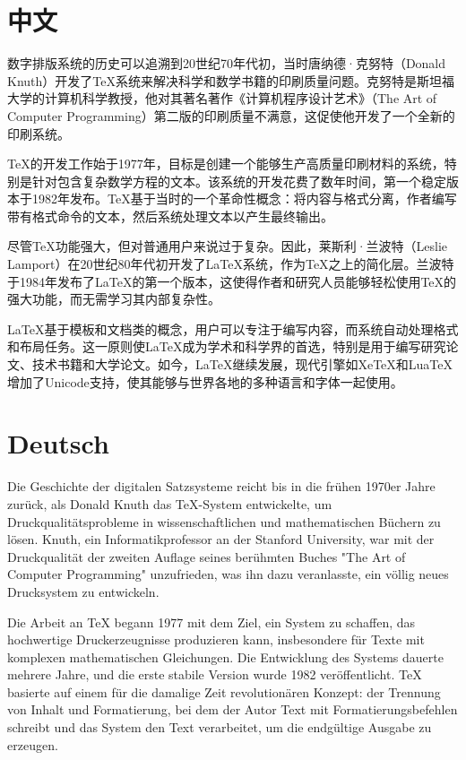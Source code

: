 \documentclass[a4paper,12pt]{article}
\newcommand{\textchinese}[1]{#1}
\begin{document}
\section{中文}
  \textchinese{数字排版系统的历史可以追溯到20世纪70年代初，当时唐纳德·克努特（Donald Knuth）开发了TeX系统来解决科学和数学书籍的印刷质量问题。克努特是斯坦福大学的计算机科学教授，他对其著名著作《计算机程序设计艺术》（The Art of Computer Programming）第二版的印刷质量不满意，这促使他开发了一个全新的印刷系统。
  
  TeX的开发工作始于1977年，目标是创建一个能够生产高质量印刷材料的系统，特别是针对包含复杂数学方程的文本。该系统的开发花费了数年时间，第一个稳定版本于1982年发布。TeX基于当时的一个革命性概念：将内容与格式分离，作者编写带有格式命令的文本，然后系统处理文本以产生最终输出。
  
  尽管TeX功能强大，但对普通用户来说过于复杂。因此，莱斯利·兰波特（Leslie Lamport）在20世纪80年代初开发了LaTeX系统，作为TeX之上的简化层。兰波特于1984年发布了LaTeX的第一个版本，这使得作者和研究人员能够轻松使用TeX的强大功能，而无需学习其内部复杂性。
  
  LaTeX基于模板和文档类的概念，用户可以专注于编写内容，而系统自动处理格式和布局任务。这一原则使LaTeX成为学术和科学界的首选，特别是用于编写研究论文、技术书籍和大学论文。如今，LaTeX继续发展，现代引擎如XeTeX和LuaTeX增加了Unicode支持，使其能够与世界各地的多种语言和字体一起使用。}

\section{Deutsch}
  Die Geschichte der digitalen Satzsysteme reicht bis in die frühen 1970er Jahre zurück, als Donald Knuth das TeX-System entwickelte, um Druckqualitätsprobleme in wissenschaftlichen und mathematischen Büchern zu lösen. Knuth, ein Informatikprofessor an der Stanford University, war mit der Druckqualität der zweiten Auflage seines berühmten Buches "The Art of Computer Programming" unzufrieden, was ihn dazu veranlasste, ein völlig neues Drucksystem zu entwickeln.
  
  Die Arbeit an TeX begann 1977 mit dem Ziel, ein System zu schaffen, das hochwertige Druckerzeugnisse produzieren kann, insbesondere für Texte mit komplexen mathematischen Gleichungen. Die Entwicklung des Systems dauerte mehrere Jahre, und die erste stabile Version wurde 1982 veröffentlicht. TeX basierte auf einem für die damalige Zeit revolutionären Konzept: der Trennung von Inhalt und Formatierung, bei dem der Autor Text mit Formatierungsbefehlen schreibt und das System den Text verarbeitet, um die endgültige Ausgabe zu erzeugen.
  
\end{document}
